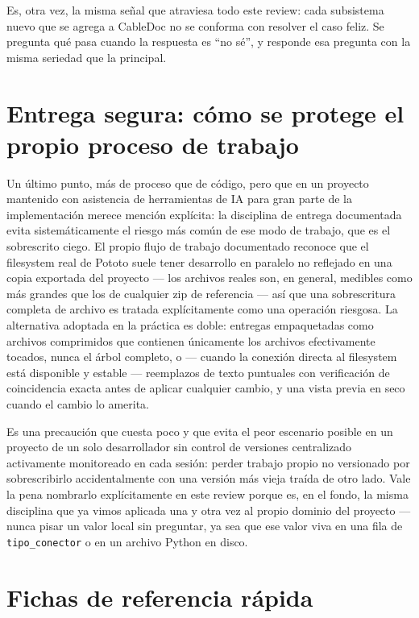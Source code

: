 \documentclass[11pt,twocolumn]{article}
\begin{document}
Es, otra vez, la misma señal que atraviesa todo este review: cada subsistema nuevo que se agrega a CableDoc no se conforma con resolver el caso feliz. Se pregunta qué pasa cuando la respuesta es ``no sé'', y responde esa pregunta con la misma seriedad que la principal.

\section{Entrega segura: cómo se protege el propio proceso de trabajo}

Un último punto, más de proceso que de código, pero que en un proyecto mantenido con asistencia de herramientas de IA para gran parte de la implementación merece mención explícita: la disciplina de entrega documentada evita sistemáticamente el riesgo más común de ese modo de trabajo, que es el sobrescrito ciego. El propio flujo de trabajo documentado reconoce que el filesystem real de Pototo suele tener desarrollo en paralelo no reflejado en una copia exportada del proyecto --- los archivos reales son, en general, medibles como más grandes que los de cualquier zip de referencia --- así que una sobrescritura completa de archivo es tratada explícitamente como una operación riesgosa. La alternativa adoptada en la práctica es doble: entregas empaquetadas como archivos comprimidos que contienen únicamente los archivos efectivamente tocados, nunca el árbol completo, o --- cuando la conexión directa al filesystem está disponible y estable --- reemplazos de texto puntuales con verificación de coincidencia exacta antes de aplicar cualquier cambio, y una vista previa en seco cuando el cambio lo amerita.

Es una precaución que cuesta poco y que evita el peor escenario posible en un proyecto de un solo desarrollador sin control de versiones centralizado activamente monitoreado en cada sesión: perder trabajo propio no versionado por sobrescribirlo accidentalmente con una versión más vieja traída de otro lado. Vale la pena nombrarlo explícitamente en este review porque es, en el fondo, la misma disciplina que ya vimos aplicada una y otra vez al propio dominio del proyecto --- nunca pisar un valor local sin preguntar, ya sea que ese valor viva en una fila de \texttt{tipo\_conector} o en un archivo Python en disco.

\section{Fichas de referencia rápida}
\end{document}
